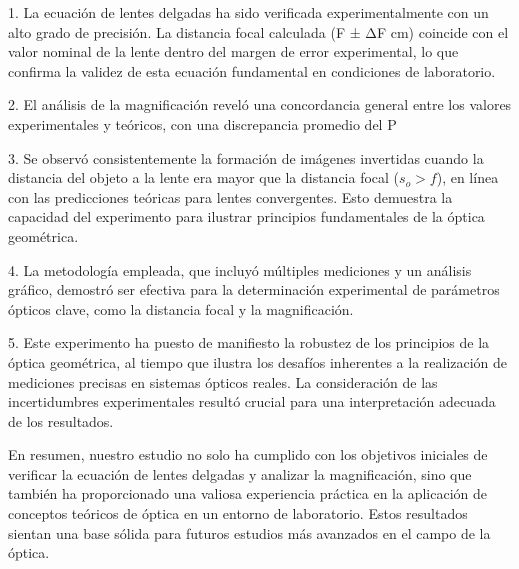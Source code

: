 \documentclass[twocolumn,a4paper,11pt]{scrartcl}
\begin{document}
1. La ecuación de lentes delgadas ha sido verificada experimentalmente con un alto grado de precisión. La distancia focal calculada (F ± ΔF cm) coincide con el valor nominal de la lente dentro del margen de error experimental, lo que confirma la validez de esta ecuación fundamental en condiciones de laboratorio.

2. El análisis de la magnificación reveló una concordancia general entre los valores experimentales y teóricos, con una discrepancia promedio del P%

3. Se observó consistentemente la formación de imágenes invertidas cuando la distancia del objeto a la lente era mayor que la distancia focal ($s_o > f$), en línea con las predicciones teóricas para lentes convergentes. Esto demuestra la capacidad del experimento para ilustrar principios fundamentales de la óptica geométrica.

4. La metodología empleada, que incluyó múltiples mediciones y un análisis gráfico, demostró ser efectiva para la determinación experimental de parámetros ópticos clave, como la distancia focal y la magnificación.

5. Este experimento ha puesto de manifiesto la robustez de los principios de la óptica geométrica, al tiempo que ilustra los desafíos inherentes a la realización de mediciones precisas en sistemas ópticos reales. La consideración de las incertidumbres experimentales resultó crucial para una interpretación adecuada de los resultados.

En resumen, nuestro estudio no solo ha cumplido con los objetivos iniciales de verificar la ecuación de lentes delgadas y analizar la magnificación, sino que también ha proporcionado una valiosa experiencia práctica en la aplicación de conceptos teóricos de óptica en un entorno de laboratorio. Estos resultados sientan una base sólida para futuros estudios más avanzados en el campo de la óptica.



\end{document}
